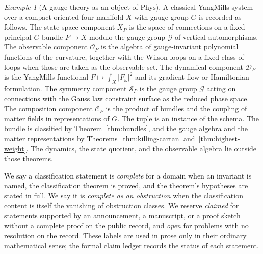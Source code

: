 \documentclass[11pt,letterpaper]{article}
\theoremstyle{definition}
\theoremstyle{remark}
\newtheorem{example}[theorem]{Example}
\begin{document}
\begin{example}[A gauge theory as an object of $\mathrm{Phys}$]
\label{ex:tuple}
A classical Yang\textendash{}Mills system over a compact oriented four-manifold $X$ with gauge group $G$ is recorded as follows. The state space component $X_P$ is the space of connections on a fixed principal $G$-bundle $P \to X$ modulo the gauge group $\mathcal{G}$ of vertical automorphisms. The observable component $\mathcal{O}_P$ is the algebra of gauge-invariant polynomial functions of the curvature, together with the Wilson loops on a fixed class of loops when those are taken as the observable set. The dynamical component $\mathcal{D}_P$ is the Yang\textendash{}Mills functional $F \mapsto \int_X |F_\omega|^2$ and its gradient flow or Hamiltonian formulation. The symmetry component $\mathcal{S}_P$ is the gauge group $\mathcal{G}$ acting on connections with the Gauss law constraint surface as the reduced phase space. The composition component $\mathcal{C}_P$ is the product of bundles and the coupling of matter fields in representations of $G$. The tuple is an instance of the schema. The bundle is classified by Theorem~\ref{thm:bundles}, and the gauge algebra and the matter representations by Theorems~\ref{thm:killing-cartan} and~\ref{thm:highest-weight}. The dynamics, the state quotient, and the observable algebra lie outside those theorems.
\end{example}

We say a classification statement is \emph{complete} for a domain when an invariant is named, the classification theorem is proved, and the theorem's hypotheses are stated in full. We say it is \emph{complete as an obstruction} when the classification content is itself the vanishing of obstruction classes. We reserve \emph{claimed} for statements supported by an announcement, a manuscript, or a proof sketch without a complete proof on the public record, and \emph{open} for problems with no resolution on the record. These labels are used in prose only in their ordinary mathematical sense; the formal claim ledger records the status of each statement.
\end{document}
